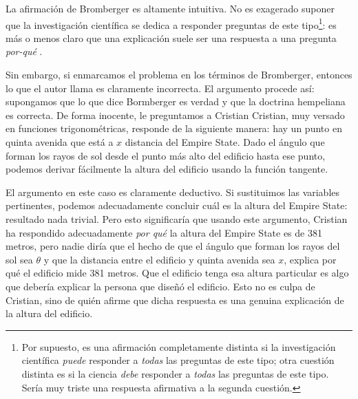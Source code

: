 La afirmación de Bromberger es altamente intuitiva. No
es exagerado suponer que la investigación científica
se dedica a responder preguntas de este tipo\footnote{
	Por supuesto, es una afirmación	completamente
	distinta si la	investigación científica \emph{puede}
    responder a \emph{todas} las	preguntas
	de este tipo; otra cuestión	distinta es si la
	ciencia \emph{debe} responder a \emph{todas}
	las	preguntas de este tipo. Sería muy	triste una
	respuesta afirmativa a	la segunda cuestión.
}:
es más o menos claro que una explicación suele ser una
respuesta a una pregunta \emph{por-qué }.

Sin embargo, si  enmarcamos el problema en los
términos de Bromberger, entonces lo que el
autor llama  es
claramente incorrecta. El argumento procede así:
supongamos que lo que dice Bormberger es verdad
y que la doctrina hempeliana es correcta. De forma
inocente, le preguntamos a Cristian 
Cristian, muy versado en funciones trigonométricas,
responde de la siguiente manera: hay un punto en
quinta  avenida que está a $ x $ distancia
del Empire State. Dado el ángulo que forman los rayos
de sol desde el punto más alto del edificio hasta ese
punto, podemos derivar fácilmente la altura del
edificio usando la función tangente.

El argumento en este caso es claramente deductivo. Si
sustituimos las variables pertinentes, podemos
adecuadamente concluir cuál es la altura del Empire
State: resultado nada trivial. Pero esto significaría
que usando este argumento, Cristian ha respondido
adecuadamente \emph{por qué} la altura del Empire
State es de 381 metros, pero nadie diría que el hecho
de que el ángulo que forman los rayos del sol sea $
\theta $ y que la distancia entre el edificio y quinta
avenida sea $ x $, explica por qué el edificio mide
381 metros. Que el edificio tenga esa altura
particular es algo que debería explicar la persona que
diseñó el edificio. Esto no es culpa de Cristian, sino
de quién afirme que dicha respuesta es una genuina
explicación de la altura del edificio.


